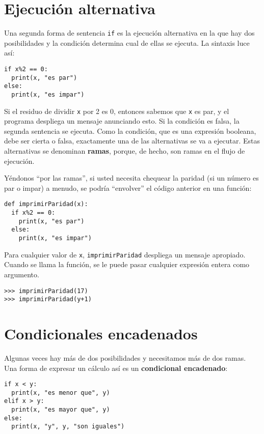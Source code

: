 \section{Ejecución alternativa}

\label{alternative execution2}

Una segunda forma de sentencia \texttt{if} es la ejecución alternativa
en la que hay dos posibilidades y la condición determina cual de ellas
se ejecuta. La sintaxis luce así:
\begin{lstlisting}
if x%2 == 0:
  print(x, "es par")
else:
  print(x, "es impar")
\end{lstlisting}

Si el residuo de dividir \texttt{x} por 2 es 0, entonces sabemos que
\texttt{x} es par, y el programa despliega un mensaje anunciando esto.
Si la condición es falsa, la segunda sentencia se ejecuta. Como la
condición, que es una expresión booleana, debe ser cierta o falsa,
exactamente una de las alternativas se va a ejecutar. Estas alternativas
se denominan \textbf{ramas}, porque, de hecho, son ramas en el flujo
de ejecución.


Yéndonos ``por las ramas'', si usted necesita chequear la paridad
(si un número es par o impar) a menudo, se podría ``envolver'' el
código anterior en una función:
\begin{lstlisting}
def imprimirParidad(x):
  if x%2 == 0:
    print(x, "es par")
  else:
    print(x, "es impar")
\end{lstlisting}

Para cualquier valor de \texttt{x}, \texttt{imprimirParidad} despliega
un mensaje apropiado. Cuando se llama la función, se le puede pasar
cualquier expresión entera como argumento.
\begin{lstlisting}
>>> imprimirParidad(17)
>>> imprimirParidad(y+1)
\end{lstlisting}

\section{Condicionales encadenados}

 

Algunas veces hay más de dos posibilidades y necesitamos más de dos
ramas. Una forma de expresar un cálculo así es un \textbf{condicional
encadenado}:

\begin{lstlisting}
if x < y:
  print(x, "es menor que", y)
elif x > y:
  print(x, "es mayor que", y)
else:
  print(x, "y", y, "son iguales")
\end{lstlisting}

